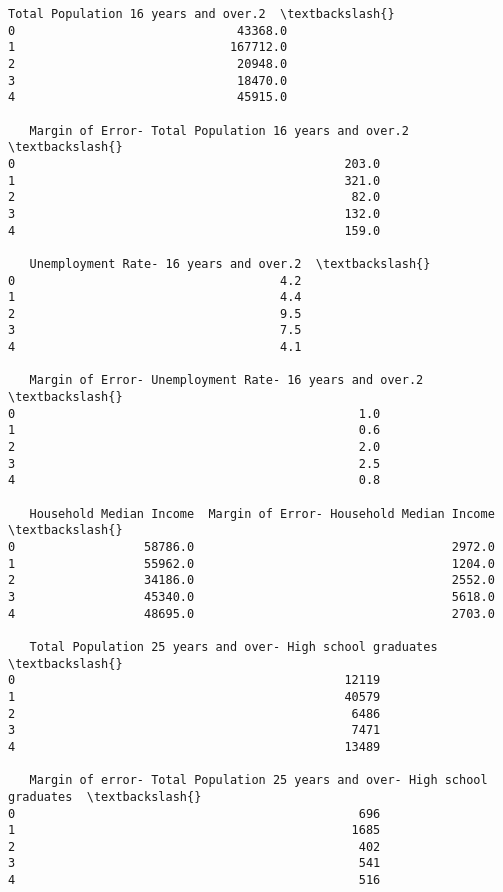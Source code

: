 \documentclass[11pt]{article}
\begin{document}
\begin{tcolorbox}[breakable, size=fbox, boxrule=.5pt, pad at break*=1mm, opacityfill=0]
\begin{Verbatim}[commandchars=\\\{\}]
   Total Population 16 years and over.2  \textbackslash{}
0                               43368.0
1                              167712.0
2                               20948.0
3                               18470.0
4                               45915.0

   Margin of Error- Total Population 16 years and over.2  \textbackslash{}
0                                              203.0
1                                              321.0
2                                               82.0
3                                              132.0
4                                              159.0

   Unemployment Rate- 16 years and over.2  \textbackslash{}
0                                     4.2
1                                     4.4
2                                     9.5
3                                     7.5
4                                     4.1

   Margin of Error- Unemployment Rate- 16 years and over.2  \textbackslash{}
0                                                1.0
1                                                0.6
2                                                2.0
3                                                2.5
4                                                0.8

   Household Median Income  Margin of Error- Household Median Income  \textbackslash{}
0                  58786.0                                    2972.0
1                  55962.0                                    1204.0
2                  34186.0                                    2552.0
3                  45340.0                                    5618.0
4                  48695.0                                    2703.0

   Total Population 25 years and over- High school graduates  \textbackslash{}
0                                              12119
1                                              40579
2                                               6486
3                                               7471
4                                              13489

   Margin of error- Total Population 25 years and over- High school graduates  \textbackslash{}
0                                                696
1                                               1685
2                                                402
3                                                541
4                                                516


\end{Verbatim}
\end{tcolorbox}
\end{document}

